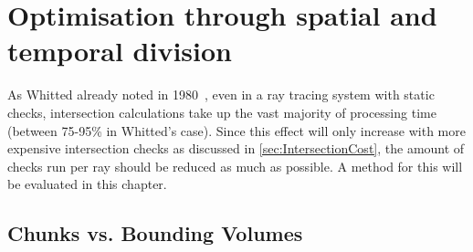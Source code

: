 \chapter{Optimisation through spatial and temporal division}\label{ch:Chunks}

As Whitted already noted in 1980~\cite{Wh80}, even in a ray tracing system with static checks,
intersection calculations take up the vast majority of processing time (between 75-95\% in Whitted's case).
Since this effect will only increase with more expensive intersection checks as discussed in \autoref{sec:IntersectionCost},
the amount of checks run per ray should be reduced as much as possible.
A method for this will be evaluated in this chapter.

\section{Chunks vs. Bounding Volumes}

